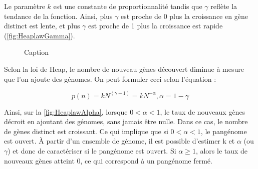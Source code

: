 Le paramètre $k$ est une constante de proportionnalité tandis que $\gamma$ reflète la tendance de la fonction. Ainsi, plus $\gamma$ est proche de 0 plus la croissance en gène distinct est lente, et plus $\gamma$ est proche de 1 plus la croissance est rapide (\autoref{fig:HeaplawGamma}).

\begin{figure}[htbp]
    \centering
    \hfill
    \caption{Caption}
    \label{fig:Heaplaw}
\end{figure}

Selon la loi de Heap, le nombre de nouveau gènes découvert diminue à mesure que l'on ajoute des génomes. On peut formuler ceci selon l'équation : 

\begin{equation}
    p(n)=kN^{(\gamma-1)}=kN^{-\alpha}, \alpha=1-\gamma
\end{equation}

Ainsi, sur la \autoref{fig:HeaplawAlpha}, lorsque $0<\alpha<1$, le taux de nouveaux gènes décroit en ajoutant des génomes, sans jamais être nulle. Dans ce cas, le nombre de gènes distinct est croissant. Ce qui implique que si $0<\alpha<1$, le pangénome est ouvert. À partir d'un ensemble de génome, il est possible d'estimer k et $\alpha$ (ou $\gamma$) et donc de caractériser si le pangénome est ouvert. Si $\alpha\geq1$, alors le taux de nouveaux gènes atteint 0, ce qui correspond à un pangénome fermé. 

